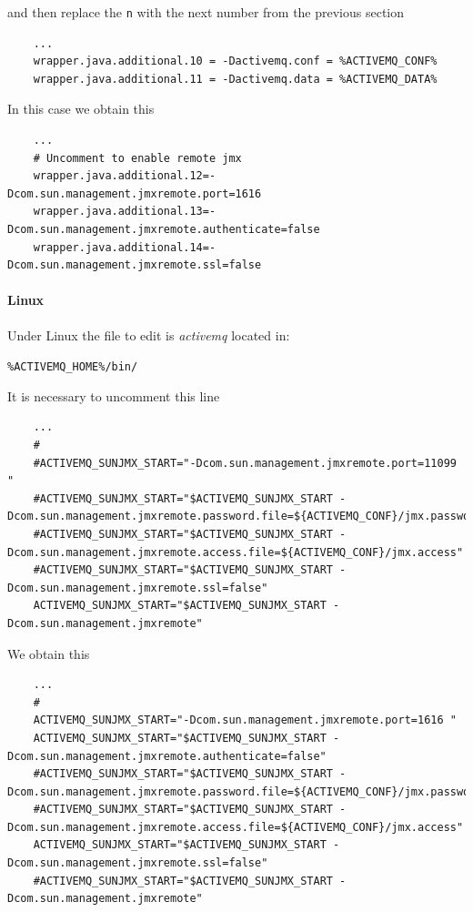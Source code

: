 \documentclass{article}
\begin{document}
and then replace the \texttt{n} with the next number from the previous section

\begin{lstlisting}
	...
	wrapper.java.additional.10 = -Dactivemq.conf = %ACTIVEMQ_CONF%
	wrapper.java.additional.11 = -Dactivemq.data = %ACTIVEMQ_DATA%
\end{lstlisting}

In this case we obtain this

\begin{lstlisting}
	...
	# Uncomment to enable remote jmx
	wrapper.java.additional.12=-Dcom.sun.management.jmxremote.port=1616
	wrapper.java.additional.13=-Dcom.sun.management.jmxremote.authenticate=false
	wrapper.java.additional.14=-Dcom.sun.management.jmxremote.ssl=false
\end{lstlisting}

\paragraph*{Linux}
Under Linux the file to edit is \textit{activemq} located in:

\verb|%ACTIVEMQ_HOME%/bin/|

It is necessary to uncomment this line

\begin{lstlisting}
	...
	#
	#ACTIVEMQ_SUNJMX_START="-Dcom.sun.management.jmxremote.port=11099 "
	#ACTIVEMQ_SUNJMX_START="$ACTIVEMQ_SUNJMX_START -Dcom.sun.management.jmxremote.password.file=${ACTIVEMQ_CONF}/jmx.password"
	#ACTIVEMQ_SUNJMX_START="$ACTIVEMQ_SUNJMX_START -Dcom.sun.management.jmxremote.access.file=${ACTIVEMQ_CONF}/jmx.access"
	#ACTIVEMQ_SUNJMX_START="$ACTIVEMQ_SUNJMX_START -Dcom.sun.management.jmxremote.ssl=false"
	ACTIVEMQ_SUNJMX_START="$ACTIVEMQ_SUNJMX_START -Dcom.sun.management.jmxremote"
\end{lstlisting}

We obtain this
\begin{lstlisting}
	...
	#
	ACTIVEMQ_SUNJMX_START="-Dcom.sun.management.jmxremote.port=1616 "
	ACTIVEMQ_SUNJMX_START="$ACTIVEMQ_SUNJMX_START -Dcom.sun.management.jmxremote.authenticate=false"
	#ACTIVEMQ_SUNJMX_START="$ACTIVEMQ_SUNJMX_START -Dcom.sun.management.jmxremote.password.file=${ACTIVEMQ_CONF}/jmx.password"
	#ACTIVEMQ_SUNJMX_START="$ACTIVEMQ_SUNJMX_START -Dcom.sun.management.jmxremote.access.file=${ACTIVEMQ_CONF}/jmx.access"
	ACTIVEMQ_SUNJMX_START="$ACTIVEMQ_SUNJMX_START -Dcom.sun.management.jmxremote.ssl=false"
	#ACTIVEMQ_SUNJMX_START="$ACTIVEMQ_SUNJMX_START -Dcom.sun.management.jmxremote"

\end{lstlisting}
\end{document}
